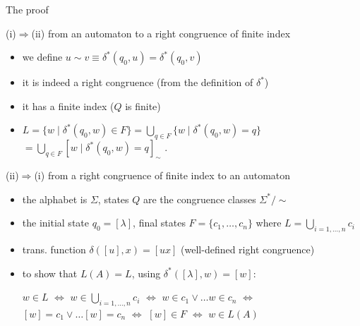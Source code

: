 \documentclass[handout]{beamer}
\begin{document}
\begin{frame}{The proof}

    \alert{(i){\Large$\Rightarrow$}(ii)} from an automaton to a right congruence of finite index
    \vspace{-6pt}
    \begin{itemize}
        \item we define \alert{$u\sim v \equiv \delta^*(q_0,u)=\delta^*(q_0,v)$}
        \item it is indeed a right congruence (from the definition of  $\delta^*$)
        \item it has a finite index ($Q$ is finite)
        \item $L=\{w \mid \delta^*(q_0,w)\in F\}=\bigcup_{q\in F}\{w\mid \delta^*(q_0,w)=q\}$ {$ =\bigcup_{q\in F} [w \mid \delta^*(q_0,w)=q]_\sim$} .
    \end{itemize}

    \vspace{-6pt}
    \alert{(ii){\Large$\Rightarrow$}(i)} from a right congruence of finite index to an automaton
    \vspace{-6pt}
    \begin{itemize}
        \item the alphabet is $\Sigma$, states \alert{$Q$ are the congruence classes $\Sigma^*/\sim$}
        \item the initial state $q_0=[\lambda]$, final states $F=\{c_1, \ldots, c_n\}$ where $L=\bigcup_{i=1,\ldots,n}c_i$
        \item trans. function \alert{$\delta([u],x)=[ux]$} {(well-defined right congruence)}
        \item to show that $L(A)=L$, using $\delta^*([\lambda],w)=[w]$: 
        
        \alert{$w\in L$} $\Leftrightarrow$ $w\in \bigcup_{i=1,\ldots,n}c_i$ $\Leftrightarrow$ $w\in c_1 \vee \ldots w\in c_n$ $\Leftrightarrow$ $[w]=c_1 \vee \ldots [w]=c_n$ $\Leftrightarrow$ $[w]\in F$ $\Leftrightarrow$ \alert{$w\in L(A)$}
        \hfill\qedsymbol
    \end{itemize}

\end{frame}
\end{document}
